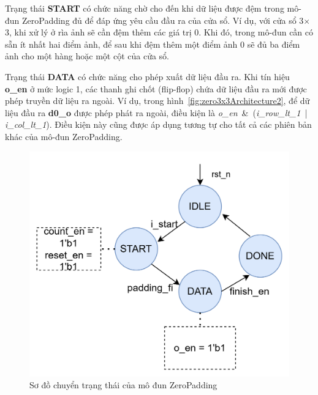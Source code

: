 Trạng thái \textbf{START} có chức năng chờ cho đến khi dữ liệu được đệm trong mô-đun ZeroPadding đủ để đáp ứng yêu cầu đầu ra của cửa sổ. Ví dụ, với cửa sổ 3$\times$3, khi xử lý ở rìa ảnh sẽ cần đệm thêm các giá trị 0. Khi đó, trong mô-đun cần có sẵn ít nhất hai điểm ảnh, để sau khi đệm thêm một điểm ảnh 0 sẽ đủ ba điểm ảnh cho một hàng hoặc một cột của cửa sổ.

Trạng thái \textbf{DATA} có chức năng cho phép xuất dữ liệu đầu ra. Khi tín hiệu \textbf{o\_en} ở mức logic 1, các thanh ghi chốt (flip-flop) chứa dữ liệu đầu ra mới được phép truyền dữ liệu ra ngoài. Ví dụ, trong hình~\ref{fig:zero3x3Architecture2}, để dữ liệu đầu ra \textbf{d0\_o} được phép phát ra ngoài, điều kiện là \textit{o\_en} \,\&\, (\textit{i\_row\_lt\_1} \,|\, \textit{i\_col\_lt\_1}). Điều kiện này cũng được áp dụng tương tự cho tất cả các phiên bản khác của mô-đun ZeroPadding.

\begin{figure}[!ht]
    \centering
    \includegraphics[width=0.6\linewidth]{figures/zeroPaddingTrans.png}
    \caption{Sơ đồ chuyển trạng thái của mô đun ZeroPadding}
    \label{fig:zeroPaddingTrans}
\end{figure}


